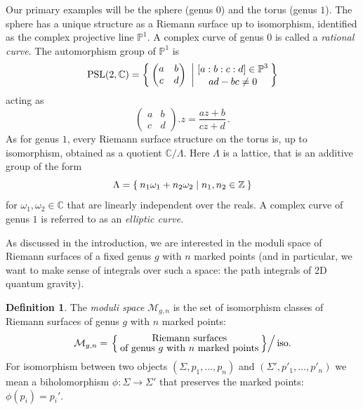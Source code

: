 \documentclass[11pt,reqno]{amsart}
\numberwithin{equation}{section}
\newcommand{\mb}[1]{\mathbb{#1}}
\newcommand{\mc}[1]{\mathcal{#1}}
\newcommand{\mr}[1]{\mathrm{#1}}
\newcommand{\Z}{\mb{Z}}
\newcommand{\C}{\mb{C}}
\renewcommand{\P}{\mb{P}}
\newcommand{\M}{\mc{M}}
\theoremstyle{plain}
\theoremstyle{definition}
\newtheorem{definition}[theorem]{Definition}
\begin{document}
Our primary examples will be the sphere (genus $0$) and the torus (genus $1$). The sphere has a unique structure as a Riemann surface up to isomorphism, identified as the complex projective line $\P^1$. A complex curve of genus $0$ is called a \emph{rational curve}. The automorphism group of $\P^1$ is
\begin{equation}
  \mr{PSL}(2,\C) = \Set{
    \begin{pmatrix}
      a & b \\
      c & d
    \end{pmatrix}
    \ \bigg| \
    \substack{
      \displaystyle [a:b:c:d] \in \P^3 \\[.5ex]
      \displaystyle ad-bc \neq 0
    }
  }
\end{equation}
acting as
\begin{equation}
  \begin{pmatrix}
    a & b \\
    c & d
  \end{pmatrix}.z
  =
  \frac{az+b}{cz+d} \,.
\end{equation}
As for genus $1$, every Riemann surface structure on the torus is, up to isomorphism, obtained as a quotient $\C/\Lambda$. Here $\Lambda$ is a lattice, that is an additive group of the form
\begin{equation}
  \Lambda = \Set{ n_1\omega_1 + n_2\omega_2 | n_1,n_2 \in \Z}
\end{equation}
for $\omega_1,\omega_2 \in \C$ that are linearly independent over the reals. A complex curve of genus $1$ is referred to as an \emph{elliptic curve}.

As discussed in the introduction, we are interested in the moduli space of Riemann surfaces of a fixed genus $g$ with $n$ marked points (and in particular, we want to make sense of integrals over such a space: the path integrals of 2D quantum gravity).

\begin{definition}
  The \emph{moduli space} $\M_{g,n}$ is the set of isomorphism classes of Riemann surfaces of genus $g$ with $n$ marked points:
  \begin{equation}
    \M_{g,n}
    =
    \left.\Set{
      \substack{
        \displaystyle\text{Riemann surfaces} \\[.5ex]
        \displaystyle\text{of genus $g$ with $n$ marked points}
      }
    }
    \right/ \text{iso.}
  \end{equation}
  For isomorphism between two objects $(\Sigma,p_1,\dots,p_n)$ and $(\Sigma',p'_1,\dots,p'_n)$ we mean a biholomorphism $\phi \colon \Sigma \to \Sigma'$ that preserves the marked points: $\phi(p_i) = p_i'$.
\end{definition}
\end{document}
